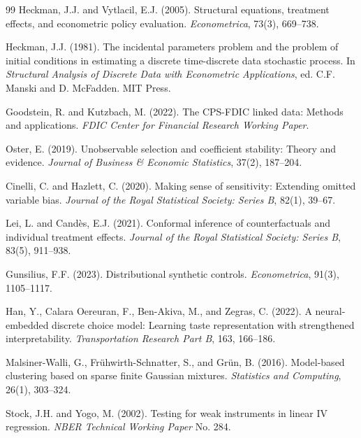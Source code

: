 \documentclass[12pt]{article}
\begin{document}
\begin{thebibliography}{99}
Heckman, J.J. and Vytlacil, E.J. (2005). Structural equations, treatment effects, and econometric policy evaluation. \textit{Econometrica}, 73(3), 669--738.

Heckman, J.J. (1981). The incidental parameters problem and the problem of initial conditions in estimating a discrete time-discrete data stochastic process. In \textit{Structural Analysis of Discrete Data with Econometric Applications}, ed. C.F. Manski and D. McFadden. MIT Press.

Goodstein, R. and Kutzbach, M. (2022). The CPS-FDIC linked data: Methods and applications. \textit{FDIC Center for Financial Research Working Paper}.

Oster, E. (2019). Unobservable selection and coefficient stability: Theory and evidence. \textit{Journal of Business \& Economic Statistics}, 37(2), 187--204.

Cinelli, C. and Hazlett, C. (2020). Making sense of sensitivity: Extending omitted variable bias. \textit{Journal of the Royal Statistical Society: Series B}, 82(1), 39--67.

Lei, L. and Cand\`{e}s, E.J. (2021). Conformal inference of counterfactuals and individual treatment effects. \textit{Journal of the Royal Statistical Society: Series B}, 83(5), 911--938.

Gunsilius, F.F. (2023). Distributional synthetic controls. \textit{Econometrica}, 91(3), 1105--1117.

Han, Y., Calara Oereuran, F., Ben-Akiva, M., and Zegras, C. (2022). A neural-embedded discrete choice model: Learning taste representation with strengthened interpretability. \textit{Transportation Research Part B}, 163, 166--186.

Malsiner-Walli, G., Fr{\"u}hwirth-Schnatter, S., and Gr{\"u}n, B. (2016). Model-based clustering based on sparse finite Gaussian mixtures. \textit{Statistics and Computing}, 26(1), 303--324.

Stock, J.H. and Yogo, M. (2002). Testing for weak instruments in linear IV regression. \textit{NBER Technical Working Paper} No. 284.

\end{thebibliography}
\end{document}
